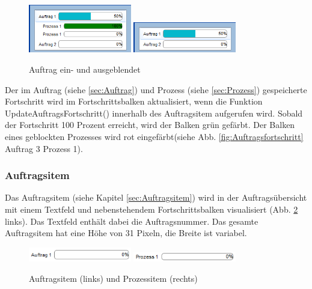 \begin{figure}[htb]
    \centering
    \includegraphics[width=0.4\textwidth]{Abbildungen/AuftragAusgeklappt.png}
    \includegraphics[width=0.4\textwidth]{Abbildungen/AuftragEingeklappt.png}
    \caption{Auftrag ein- und ausgeblendet}		
    \label{fig:Auftragsausblendung}
\end{figure}

Der im Auftrag (siehe \ref{sec:Auftrag}) und Prozess (siehe \ref{sec:Prozess}) gespeicherte Fortschritt wird im Fortschrittsbalken aktualisiert, wenn die Funktion UpdateAuftragsFortschritt() innerhalb des Auftragsitem aufgerufen wird. Sobald der Fortschritt 100 Prozent erreicht, wird der Balken grün gefärbt. Der Balken eines geblockten Prozesses wird rot eingefärbt(siehe Abb. \ref{fig:Auftragsfortschritt} Auftrag 3 Prozess 1). 

\subsubsection{Auftragsitem}

Das Auftragsitem (siehe Kapitel \ref{sec:Auftragsitem}) wird in der Auftragsübersicht mit einem Textfeld und nebenstehendem Fortschrittsbalken visualisiert (Abb. \ref{fig:Auftragsitem} links). Das Textfeld enthält dabei die Auftragsnummer. Das gesamte Auftragsitem hat eine Höhe von 31 Pixeln, die Breite ist variabel. 

\begin{figure}[htb]
    \centering
    \includegraphics[width=0.4\textwidth]{Abbildungen/Auftragsitem.png}
    \includegraphics[width=0.4\textwidth]{Abbildungen/Prozessitem.png}
    \caption{Auftragsitem (links) und Prozessitem (rechts)}		
    \label{fig:Auftragsitem}
\end{figure}


